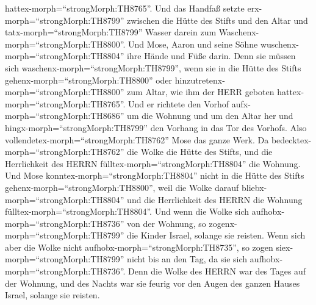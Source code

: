 hattex-morph=``strongMorph:TH8765''.  Und das Handfaß
setzte erx-morph=``strongMorph:TH8799'' zwischen die Hütte des Stifts
und den Altar und tatx-morph=``strongMorph:TH8799'' Wasser darein zum
Waschenx-morph=``strongMorph:TH8800''.  Und Mose, Aaron und
seine Söhne wuschenx-morph=``strongMorph:TH8804'' ihre Hände und Füße
darin.  Denn sie müssen sich
waschenx-morph=``strongMorph:TH8799'', wenn sie in die Hütte des Stifts
gehenx-morph=``strongMorph:TH8800'' oder
hinzutretenx-morph=``strongMorph:TH8800'' zum Altar, wie ihm der HERR
geboten hattex-morph=``strongMorph:TH8765''.  Und er
richtete den Vorhof aufx-morph=``strongMorph:TH8686'' um die Wohnung und
um den Altar her und hingx-morph=``strongMorph:TH8799'' den Vorhang in
das Tor des Vorhofs. Also vollendetex-morph=``strongMorph:TH8762'' Mose
das ganze Werk.  Da bedecktex-morph=``strongMorph:TH8762''
die Wolke die Hütte des Stifts, und die Herrlichkeit des HERRN
fülltex-morph=``strongMorph:TH8804'' die Wohnung.  Und Mose
konntex-morph=``strongMorph:TH8804'' nicht in die Hütte des Stifts
gehenx-morph=``strongMorph:TH8800'', weil die Wolke darauf
bliebx-morph=``strongMorph:TH8804'' und die Herrlichkeit des HERRN die
Wohnung fülltex-morph=``strongMorph:TH8804''.  Und wenn die
Wolke sich aufhobx-morph=``strongMorph:TH8736'' von der Wohnung, so
zogenx-morph=``strongMorph:TH8799'' die Kinder Israel, solange sie
reisten.  Wenn sich aber die Wolke nicht
aufhobx-morph=``strongMorph:TH8735'', so zogen
siex-morph=``strongMorph:TH8799'' nicht bis an den Tag, da sie sich
aufhobx-morph=``strongMorph:TH8736''.  Denn die Wolke des
HERRN war des Tages auf der Wohnung, und des Nachts war sie feurig vor
den Augen des ganzen Hauses Israel, solange sie reisten.
